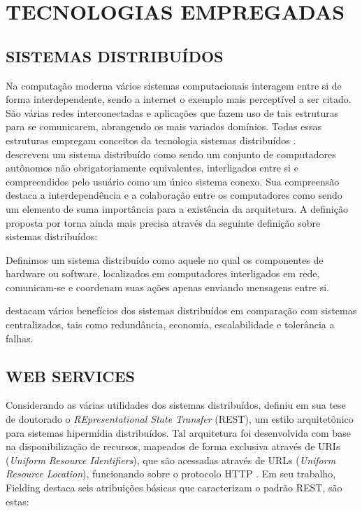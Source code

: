\section{TECNOLOGIAS EMPREGADAS}

\subsection{SISTEMAS DISTRIBUÍDOS}

Na computação moderna vários sistemas computacionais interagem entre si de forma interdependente, sendo a internet o exemplo mais perceptível a ser citado. São várias redes interconectadas e aplicações que fazem uso de tais estruturas para se comunicarem, abrangendo os mais variados domínios. Todas essas estruturas empregam conceitos da tecnologia sistemas distribuídos \cite{puder2011distributed}.\\
 descrevem um sistema distribuído como sendo um conjunto de computadores autônomos não obrigatoriamente equivalentes, interligados entre si e compreendidos pelo usuário como um único sistema conexo. Sua compreensão destaca a interdependência e a colaboração entre os computadores como sendo um elemento de suma importância para a existência da arquitetura. A definição proposta por  torna ainda mais precisa através da seguinte definição sobre sistemas distribuídos:

\begin{citacao}
	Definimos um sistema distribuído como aquele no qual os componentes de hardware ou software, localizados em computadores interligados em rede, comunicam-se e coordenam suas ações apenas enviando mensagens entre si.
\end{citacao}

 destacam vários benefícios dos sistemas distribuídos em comparação com sistemas centralizados, tais como redundância, economia, escalabilidade e tolerância a falhas.

\subsection{WEB SERVICES}

Considerando as várias utilidades dos sistemas distribuídos,  definiu em sua tese de doutorado o \textit{REpresentational State Transfer} (REST), um estilo arquitetônico para sistemas hipermídia distribuídos. Tal arquitetura foi desenvolvida com base na disponibilização de recursos, mapeados de forma exclusiva através de URIs (\textit{Uniform Resource Identifiers}), que são acessadas através de URLs (\textit{Uniform Resource Location}), funcionando sobre o protocolo HTTP \cite{richardson2008restful}. Em seu trabalho, Fielding destaca seis atribuições básicas que caracterizam o padrão REST, são estas:

